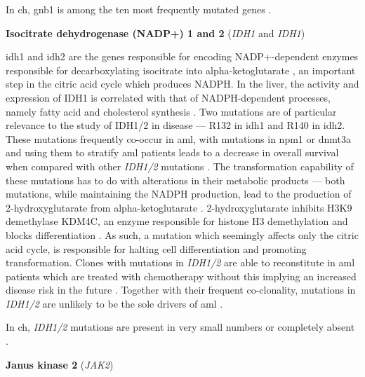In \ac{ch}, \ac{gnb1} is among the ten most frequently mutated genes \cite{Jaiswal2014-rl}.

\noindent \textbf{Isocitrate dehydrogenase (NADP+) 1 and 2} (\textit{IDH1} and \textit{IDH1})

\Ac{idh1} and \ac{idh2} are the genes responsible for encoding NADP+-dependent enzymes responsible for decarboxylating isocitrate into alpha-ketoglutarate \cite{Nekrutenko1998-ld}, an important step in the citric acid cycle which produces NADPH. In the liver, the activity and expression of IDH1 is correlated with that of NADPH-dependent processes, namely fatty acid and cholesterol synthesis \cite{Shechter2003-vd}. Two mutations are of particular relevance to the study of IDH1/2 in disease --- R132 in \ac{idh1} and R140 in \ac{idh2}. These mutations frequently co-occur in \ac{aml}, with mutations in \ac{npm1} or \ac{dnmt3a} and using them to stratify \ac{aml} patients leads to a decrease in overall survival when compared with other \textit{IDH1/2} mutations \cite{Meggendorfer2018-me,Mardis2009-gl}. The transformation capability of these mutations has to do with alterations in their metabolic products --- both mutations, while maintaining the NADPH production, lead to the production of 2-hydroxyglutarate from alpha-ketoglutarate \cite{Ward2010-fi}. 2-hydroxyglutarate inhibits H3K9 demethylase KDM4C, an enzyme responsible for histone H3 demethylation and blocks differentiation \cite{Lu2012-ix}. As such, a mutation which seemingly affects only the citric acid cycle, is responsible for halting cell differentiation and promoting transformation. Clones with mutations in \textit{IDH1/2} are able to reconstitute in \ac{aml} patients which are treated with chemotherapy without this implying an increased disease risk in the future \cite{Wiseman2016-kw}. Together with their frequent co-clonality, mutations in \textit{IDH1/2} are unlikely to be the sole drivers of \ac{aml} \cite{Hasserjian2020-qj}.

In \ac{ch}, \textit{IDH1/2} mutations are present in very small numbers or completely absent \cite{Jaiswal2014-rl,Genovese2014-eu,Xie2014-np}. 

\noindent \textbf{Janus kinase 2} (\textit{JAK2})

